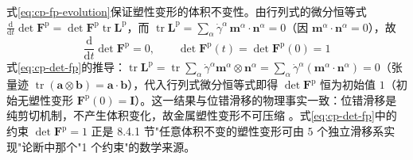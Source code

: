 式\eqref{eq:cp-fp-evolution}保证塑性变形的体积不变性。由行列式的微分恒等式 $\tfrac{\mathrm{d}}{\mathrm{d}t}\det\mathbf{F}^{\mathrm{p}}=\det\mathbf{F}^{\mathrm{p}}\operatorname{tr}\mathbf{L}^{\mathrm{p}}$，而 $\operatorname{tr}\mathbf{L}^{\mathrm{p}}=\sum_{\alpha}\dot{\gamma}^{\alpha}\,\mathbf{m}^{\alpha}\cdot\mathbf{n}^{\alpha}=0$（因 $\mathbf{m}^{\alpha}\cdot\mathbf{n}^{\alpha}=0$），故
\begin{equation}
  \frac{\mathrm{d}}{\mathrm{d}t}\det\mathbf{F}^{\mathrm{p}}=0,\qquad
  \det\mathbf{F}^{\mathrm{p}}(t)=\det\mathbf{F}^{\mathrm{p}}(0)=1
  \label{eq:cp-det-fp}
\end{equation}
式\eqref{eq:cp-det-fp}的推导：$\operatorname{tr}\mathbf{L}^{\mathrm{p}}=\operatorname{tr}\sum_{\alpha}\dot{\gamma}^{\alpha}\mathbf{m}^{\alpha}\otimes\mathbf{n}^{\alpha}=\sum_{\alpha}\dot{\gamma}^{\alpha}(\mathbf{m}^{\alpha}\cdot\mathbf{n}^{\alpha})=0$（张量迹 $\operatorname{tr}(\mathbf{a}\otimes\mathbf{b})=\mathbf{a}\cdot\mathbf{b}$），代入行列式微分恒等式即得 $\det\mathbf{F}^{\mathrm{p}}$ 恒为初始值 $1$（初始无塑性变形 $\mathbf{F}^{\mathrm{p}}(0)=\mathbf{I}$）。这一结果与位错滑移的物理事实一致：位错滑移是纯剪切机制，不产生体积变化，故金属塑性变形不可压缩 \cite{Asaro1983}。式\eqref{eq:cp-det-fp}中的约束 $\det\mathbf{F}^{\mathrm{p}}=1$ 正是 8.4.1 节"任意体积不变的塑性变形可由 $5$ 个独立滑移系实现"论断中那个"1 个约束"的数学来源。

